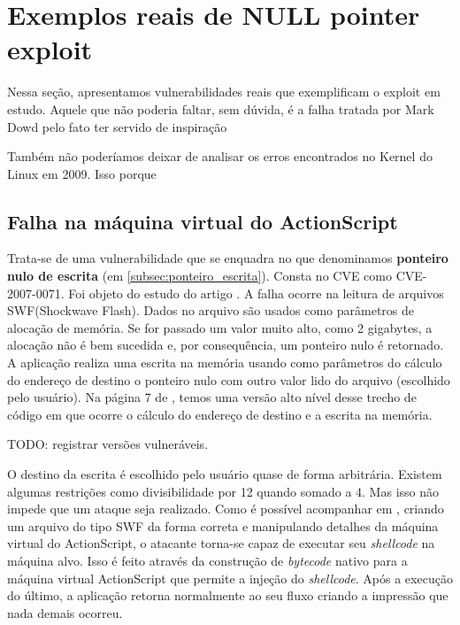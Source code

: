 	\section{Exemplos reais de NULL pointer exploit}
	\label{sec:exemplos_null_pointer}

		Nessa seção, apresentamos vulnerabilidades reais que exemplificam o exploit em estudo.
		Aquele que não poderia faltar, sem dúvida, é a falha tratada por Mark Dowd pelo fato
		ter servido de inspiração


		Também não poderíamos deixar de analisar os erros encontrados no Kernel do Linux em 2009.
		Isso porque 
			

		\subsection{Falha na máquina virtual do ActionScript}
			Trata-se de uma vulnerabilidade que se enquadra no que denominamos \textbf{ponteiro nulo de escrita} (em 
			\ref{subsec:ponteiro_escrita}).
			Consta no CVE como CVE-2007-0071. Foi objeto do estudo do artigo \cite{Dowd2008}.
			A falha ocorre na leitura de arquivos SWF(Shockwave Flash). Dados no arquivo são usados
			como parâmetros de alocação de memória. Se for passado um valor muito alto, como 2 gigabytes,
			a alocação não é bem sucedida e, por consequência, um ponteiro nulo é retornado.
			A aplicação realiza uma escrita na memória usando como parâmetros do cálculo do endereço de destino
			o ponteiro nulo com outro valor lido do arquivo (escolhido pelo usuário).
			Na página 7 de \cite{Dowd2008}, temos uma versão alto nível desse trecho de código
			em que ocorre o cálculo do endereço de destino e a escrita na memória.
			

			TODO: registrar versões vulneráveis.
			

			O destino da escrita é escolhido pelo usuário quase de forma arbitrária. Existem algumas restrições
			como divisibilidade por 12 quando somado a 4. Mas isso não impede que um ataque seja realizado.
			Como é possível acompanhar em \cite{Dowd2008}, criando um arquivo do tipo SWF da forma
			correta e manipulando detalhes da máquina virtual do ActionScript, o atacante torna-se
			capaz de executar seu \textsl{shellcode} na máquina alvo. Isso é feito através da construção
			de \textsl{bytecode} nativo para a máquina virtual ActionScript que permite a injeção do \textsl{shellcode}.
			Após a execução do último, a aplicação retorna normalmente ao seu fluxo criando a impressão que
			nada demais ocorreu.

